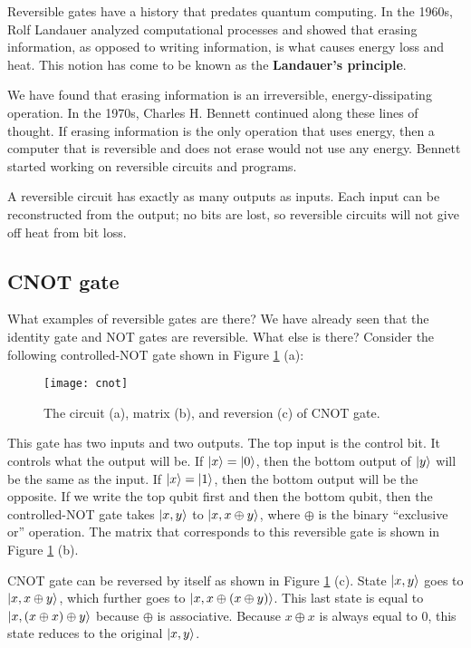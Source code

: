 \documentclass{easyclass}
\begin{document}
Reversible gates have a history that predates quantum computing. In the 1960s, Rolf Landauer analyzed computational processes and showed that erasing information, as opposed to writing information, is what causes energy loss and heat. This notion has come to be known as the \textbf{Landauer’s principle}.

We have found that erasing information is an irreversible, energy-dissipating
operation. In the 1970s, Charles H. Bennett continued along these lines of thought.
If erasing information is the only operation that uses energy, then a computer that
is reversible and does not erase would not use any energy. Bennett started working
on reversible circuits and programs.

A reversible circuit has exactly as many outputs as inputs. Each input can be reconstructed from the output; no bits are lost, so reversible circuits will not give off heat from bit loss.

\subsection{CNOT gate}
What examples of reversible gates are there? We have already seen that the identity gate and NOT gates are reversible. What else is there? Consider the following controlled-NOT gate shown in Figure \ref{fig:cnot} (a):

\begin{figure}[h]
	\centering
	\texttt{[image: cnot]}
	\caption{The circuit (a), matrix (b), and reversion (c) of CNOT gate.}
	\label{fig:cnot}
\end{figure}

This gate has two inputs and two outputs. The top input is the control bit. It controls what the output will be. If $\ket{x}=\ket{0}$, then the bottom output of $\ket{y}$ will be the same as the input. If $\ket{x}=\ket{1}$, then the bottom output will be the opposite. If we write the top qubit first and then the bottom qubit, then the controlled-NOT gate takes $\ket{x,y}$ to $\ket{x,x\oplus y}$, where $\oplus$ is the binary ``exclusive or'' operation. The matrix that corresponds to this reversible gate is shown in Figure \ref{fig:cnot} (b).

CNOT gate can be reversed by itself as shown in Figure \ref{fig:cnot} (c). State $\ket{x,y}$ goes to $\ket{x,x\oplus y}$, which further goes to $\ket{x,x\oplus(x\oplus y)}$. This last
state is equal to $\ket{x,(x\oplus x)\oplus y}$ because $\oplus$ is associative. Because $x\oplus x$ is always equal to $0$, this state reduces to the original $\ket{x,y}$.
\end{document}
